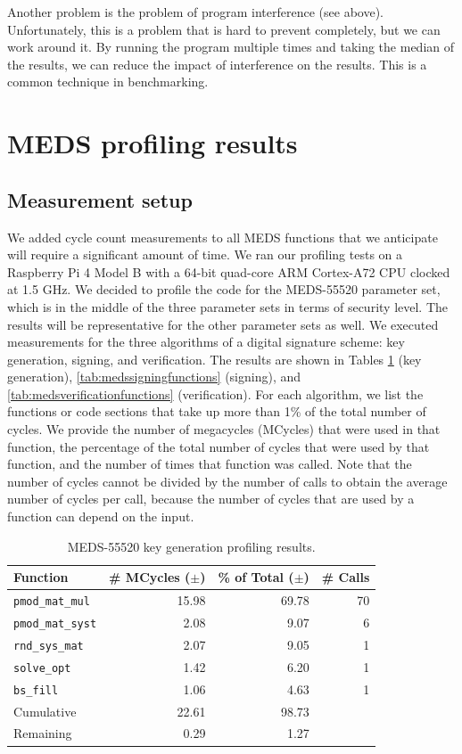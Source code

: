 \documentclass[11pt,a4paper]{report}
\theoremstyle{definition}
\begin{document}
Another problem is the problem of program interference (see above). Unfortunately, this is a problem that is hard to prevent completely, but we can work around it. By running the program multiple times and taking the median of the results, we can reduce the impact of interference on the results. This is a common technique in benchmarking.

\section{MEDS profiling results}
\label{sec:medsprofilingresults}

\subsection{Measurement setup}
We added cycle count measurements to all MEDS functions that we anticipate will require a significant amount of time. We ran our profiling tests on a Raspberry Pi 4 Model B with a 64-bit quad-core ARM Cortex-A72 CPU clocked at 1.5 GHz. We decided to profile the code for the MEDS-55520 parameter set, which is in the middle of the three parameter sets in terms of security level. The results will be representative for the other parameter sets as well. We executed measurements for the three algorithms of a digital signature scheme: key generation, signing, and verification. The results are shown in Tables \ref{tab:medskeygenfunctions} (key generation), \ref{tab:medssigningfunctions} (signing), and \ref{tab:medsverificationfunctions} (verification). For each algorithm, we list the functions or code sections that take up more than 1\% of the total number of cycles. We provide the number of megacycles (MCycles) that were used in that function, the percentage of the total number of cycles that were used by that function, and the number of times that function was called. Note that the number of cycles cannot be divided by the number of calls to obtain the average number of cycles per call, because the number of cycles that are used by a function can depend on the input.

\begin{table}[]
  \centering
  \begin{tabular}{lrrr}
    \toprule
    \textbf{Function} & \textbf{\# MCycles} ($\pm$) & \textbf{\% of Total} ($\pm$) & \textbf{\# Calls} \\
    \midrule
      \texttt{pmod\_mat\_mul} & 15.98 & 69.78 & 70 \\
      \texttt{pmod\_mat\_syst} & 2.08 & 9.07 & 6 \\
      \texttt{rnd\_sys\_mat} & 2.07 & 9.05 & 1 \\
      \texttt{solve\_opt} & 1.42 & 6.20 & 1 \\
      \texttt{bs\_fill} & 1.06 & 4.63 & 1 \\
    \midrule
      Cumulative & 22.61 & 98.73 & \\
      Remaining & 0.29 & 1.27 & \\
    \bottomrule
  \end{tabular}
  \caption{MEDS-55520 key generation profiling results.}
  \label{tab:medskeygenfunctions}
\end{table}
\end{document}

